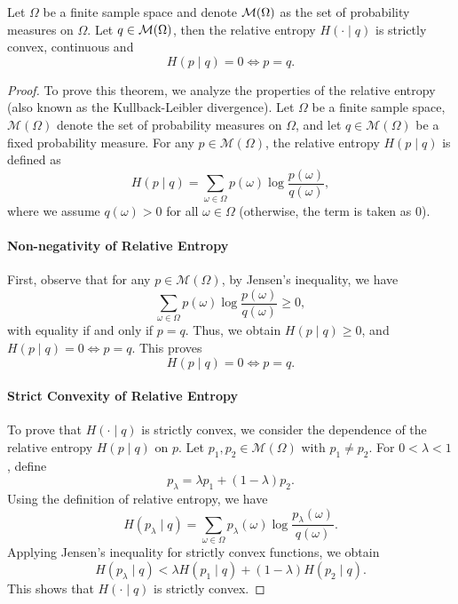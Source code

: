 \begin{proposition}

\end{proposition}

\begin{lemma}
	Let \(\Omega\) be a finite sample space and denote \(\mathcal{M}(\Omega)\) as the set of probability measures on \(\Omega\). Let \(q\in\mathcal{M}(\Omega)\), then the relative entropy \(H(\cdot\mid q)\) is strictly convex, continuous and
	\begin{equation}
		H(p\mid q)=0\iff p=q.
	\end{equation}
\end{lemma}

\begin{proof}
	To prove this theorem, we analyze the properties of the relative entropy (also known as the Kullback-Leibler divergence). Let \(\Omega\) be a finite sample space, \(\mathcal{M}(\Omega)\) denote the set of probability measures on \(\Omega\), and let \(q \in \mathcal{M}(\Omega)\) be a fixed probability measure. For any \(p \in \mathcal{M}(\Omega)\), the relative entropy \(H(p \mid q)\) is defined as
	\[
		H(p \mid q) = \sum_{\omega \in \Omega} p(\omega) \log \frac{p(\omega)}{q(\omega)},
	\]
	where we assume \(q(\omega) > 0\) for all \(\omega \in \Omega\) (otherwise, the term is taken as \(0\)).

	\paragraph*{Non-negativity of Relative Entropy}
	First, observe that for any \(p \in \mathcal{M}(\Omega)\), by Jensen's inequality, we have
	\[
		\sum_{\omega \in \Omega} p(\omega) \log \frac{p(\omega)}{q(\omega)} \geq 0,
	\]
	with equality if and only if \(p = q\). Thus, we obtain \(H(p \mid q) \geq 0\), and \(H(p \mid q) = 0 \iff p = q\). This proves
	\[
		H(p \mid q) = 0 \iff p = q.
	\]

	\paragraph*{Strict Convexity of Relative Entropy}
	To prove that \(H(\cdot \mid q)\) is strictly convex, we consider the dependence of the relative entropy \(H(p \mid q)\) on \(p\). Let \(p_1, p_2 \in \mathcal{M}(\Omega)\) with \(p_1 \neq p_2\). For \(0 < \lambda < 1\), define
	\[
		p_\lambda = \lambda p_1 + (1 - \lambda) p_2.
	\]
	Using the definition of relative entropy, we have
	\[
		H(p_\lambda \mid q) = \sum_{\omega \in \Omega} p_\lambda(\omega) \log \frac{p_\lambda(\omega)}{q(\omega)}.
	\]
	Applying Jensen's inequality for strictly convex functions, we obtain
	\[
		H(p_\lambda \mid q) < \lambda H(p_1 \mid q) + (1 - \lambda) H(p_2 \mid q).
	\]
	This shows that \(H(\cdot \mid q)\) is strictly convex.


\end{proof}
